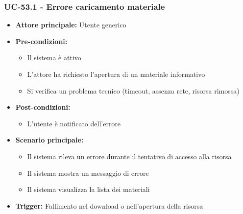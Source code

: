 \documentclass[a4paper,12pt]{article}
\begin{document}
\subsubsection{UC-53.1 - Errore caricamento materiale} \label{subsec:UC-53.1}
\begin{itemize}
    \item \textbf{Attore principale:} Utente generico
    \item \textbf{Pre-condizioni:}
    \begin{itemize}
        \item Il sistema è attivo
        \item L'attore ha richiesto l'apertura di un materiale informativo
        \item Si verifica un problema tecnico (timeout, assenza rete, risorsa rimossa)
    \end{itemize}
    \item \textbf{Post-condizioni:}
    \begin{itemize}
        \item L'utente è notificato dell'errore
    \end{itemize}
    \item \textbf{Scenario principale:} 
    \begin{itemize}
        \item Il sistema rileva un errore durante il tentativo di accesso alla risorsa
        \item Il sistema mostra un messaggio di errore
        \item Il sistema visualizza la lista dei materiali
    \end{itemize}
    \item \textbf{Trigger:} Fallimento nel download o nell'apertura della risorsa
\end{itemize}
\end{document}
